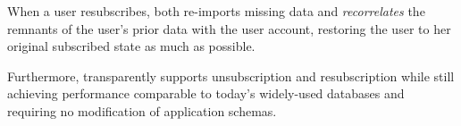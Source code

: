 When a user resubscribes, \sys both re-imports missing data and
\emph{recorrelates} the remnants of the user's prior data with the user account,
restoring the user to her original subscribed state as much as possible.

Furthermore, \sys transparently supports unsubscription and resubscription while still achieving performance
comparable to today’s widely-used databases and requiring no modification of application schemas.

%
%
%
%
